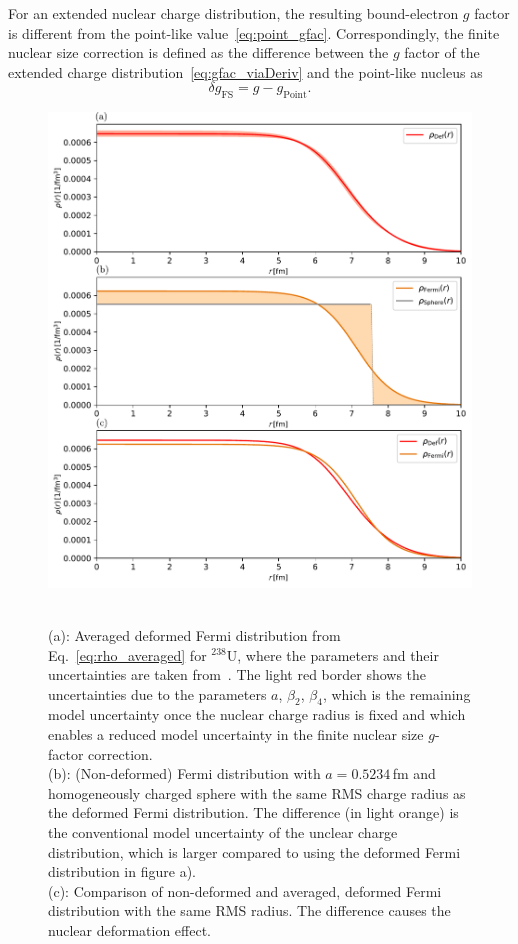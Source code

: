 For an extended nuclear charge distribution, the resulting bound-electron $g$ factor is different from the point-like value~\eqref{eq:point_gfac}. Correspondingly, the finite nuclear size correction is defined as the difference between the $g$ factor of the extended charge distribution~\eqref{eq:gfac_viaDeriv} and the point-like nucleus as
\begin{equation}
\delta g_{\text{FS}}=g-g_{\text{Point}}.
\end{equation}
%
\begin{figure}
\centering
\includegraphics[width=\textwidth]{pics/chargeDistr2.pdf}\\
\caption{\label{fig:charge distr.}\\
(a): Averaged deformed Fermi distribution from Eq.~\ref{eq:rho_averaged} for $^{238}$U, where the parameters and their uncertainties are taken from~\cite{kozhedub2008}. The light red border shows the uncertainties due to the parameters $a$, $\beta_2$, $\beta_4$, which is the remaining model uncertainty once the nuclear charge radius is fixed and which enables a reduced model uncertainty in the finite nuclear size $g$-factor correction.\\
(b): (Non-deformed) Fermi distribution with $a=0.5234\,$fm and homogeneously charged sphere with the same RMS charge radius as the deformed Fermi distribution. The difference (in light orange) is the conventional model uncertainty of the unclear charge distribution, which is larger compared to using the deformed Fermi distribution in figure a).\\
(c): Comparison of non-deformed and averaged, deformed Fermi distribution with the same RMS radius. The difference causes the nuclear deformation effect.}
\end{figure}
%
